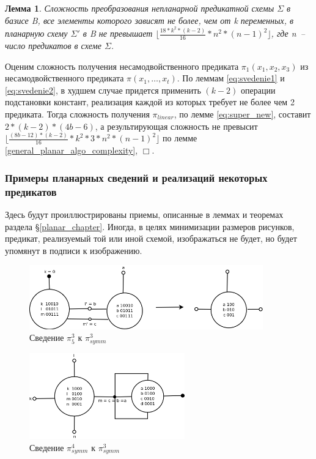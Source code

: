 \documentclass[12pt]{article}
\newtheorem{lemma}[theorem]{Лемма}
\newenvironment{proof}[1][Доказательство]{\begin{trivlist}
\item[\hskip \labelsep {\bfseries #1}]}{\end{trivlist}}
\begin{document}
\begin{lemma}
Сложность преобразования непланарной предикатной схемы $\Sigma$ в базисе B, 
все элементы которого зависят не более, чем от k переменных, 
в планарную схему $\Sigma'$ в B не превышает $\lfloor \frac{18 * k^2 * (k-2)}{16} * n^2 * (n-1)^2 \rfloor$, где n~-- число предикатов в схеме $\Sigma$.
\end{lemma}
\begin{proof}
Оценим сложность получения несамодвойственного предиката $\pi_1(x_1, x_2, x_3)$ из несамодвойственного предиката
$\pi(x_1, \dots, x_t)$. По леммам \ref{eq:svedenie1} и \ref{eq:svedenie2}, в худшем случае придется применить $(k-2)$ 
операции подстановки констант, реализация каждой из которых требует не более чем 2 предиката.
Тогда сложность получения $\pi_{linear}$, по лемме \ref{eq:super_new}, составит $2 * (k-2) * (4b - 6)$, а
результирующая сложность не превысит $\lfloor \frac{(8b - 12) * (k-2)}{16} * k^2 * 3 * n^2 * (n-1)^2 \rfloor $ по лемме 
\ref{general_planar_algo_complexity}, $\Box$.
\end{proof}

\clearpage
\subsubsection{Примеры планарных сведений и реализаций некоторых предикатов}
Здесь будут проиллюстрированы приемы, описанные в леммах и теоремах раздела \S \ref{planar_chapter}. 
Иногда, в целях минимизации размеров рисунков, предикат, реализуемый той или иной схемой, изображаться не будет, 
но будет упомянут в подписи к изображению.

\begin{figure}[htb]
\centering
\includegraphics[width=0.9\textwidth]{3_2to3.png}
\caption{Сведение $\pi_5^3$ к $\pi_{symm}^3$ }
\label{fig:3_2to3}
\end{figure}

\begin{figure}[htb]
 \centering
\includegraphics[width=0.6\textwidth]{4to3.png}
\caption{Сведение $\pi_{symm}^4$ к $\pi_{symm}^3$ }
\label{fig:4to3}
\end{figure}
\end{document}
